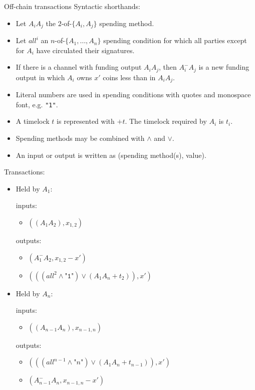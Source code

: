 \begin{notitlebox}{Off-chain transactions}
  Syntactic shorthands:
  \begin{itemize}
    \item Let $A_i A_j$ the $2$-of-$\{A_i, A_j\}$ spending method.
    \item Let $\mathit{all}^i$ an $n$-of-$\{A_1, \dots, A_n\}$ spending
    condition for which all parties except for $A_i$ have circulated their
    signatures.
    \item If there is a channel with funding output $A_i A_j$, then $A_i^{-}
    A_j$ is a new funding output in which $A_i$ owns $x'$ coins less than in
    $A_i A_j$.
    \item Literal numbers are used in spending conditions with quotes and
    monospace font, e.g. \texttt{"1"}.
    \item A timelock $t$ is represented with $+t$. The timelock required by
    $A_i$ is $t_i$.
    \item Spending methods may be combined with $\wedge$ and $\vee$.
    \item An input or output is written as (spending method(s), value).
  \end{itemize}
  Transactions:
  \begin{itemize}
    \item Held by $A_1$:

    inputs:
    \begin{itemize}
      \item $((A_1 A_2), x_{1,2})$
    \end{itemize}
    outputs:
    \begin{itemize}
      \item $(A_1^- A_2, x_{1,2} - x')$
      \item $(((\mathit{all}^2 \wedge \texttt{"1"}) \vee (A_1 A_n + t_2)), x')$
    \end{itemize}

    \item Held by $A_n$:

    inputs:
    \begin{itemize}
      \item $((A_{n-1} A_n), x_{n-1,n})$
    \end{itemize}
    outputs:
    \begin{itemize}
      \item $(((\mathit{all}^{n-1} \wedge \texttt{"}n\texttt{"}) \vee (A_1 A_n +
      t_{n-1})), x')$
      \item $(A_{n-1}^- A_n, x_{n-1,n} - x')$
    \end{itemize}


\end{itemize}
\end{notitlebox}

